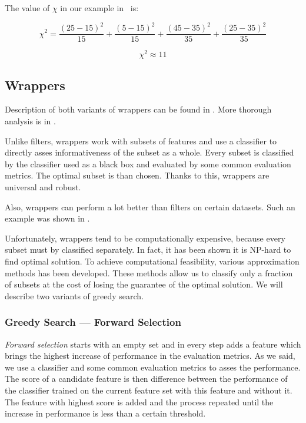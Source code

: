 The value of $\chi$ in our example in 
~is:

\begin{equation}
\chi^2 = 
\frac{\left(25-15\right)^2}{15} +
\frac{\left(5-15\right)^2}{15} +
\frac{\left(45-35\right)^2}{35} +
\frac{\left(25-35\right)^2}{35}
\end{equation}

\begin{equation}
\chi^2 \approx 11
\end{equation}


\subsection{Wrappers}

Description of both variants of wrappers can be found in \citet{GuyEli03}.
More thorough analysis is in \citet{kohavi1997wrappers}.

Unlike filters, wrappers work with subsets of features
and use a classifier to directly asses informativeness of the subset as a whole.
Every subset is classified by the classifier used as a black box
and evaluated by some common evaluation metrics.
The optimal subset is than chosen.
Thanks to this, wrappers are universal and robust.

Also, wrappers can perform a lot better than filters on certain datasets.
Such an example was shown in .

Unfortunately, wrappers tend to be computationally expensive,
because every subset must by classified separately.
In fact, it has been shown it is NP-hard to find optimal solution.
To achieve computational feasibility, various approximation methods has been developed.
These methods allow us to classify only a fraction of subsets
at the cost of losing the guarantee of the optimal solution.
We will describe two variants of greedy search.


\subsubsection{Greedy Search --- Forward Selection}

{\it Forward selection} starts with an empty set and in every step adds a feature which brings the highest increase of performance in the evaluation metrics.
As we said, we use a classifier and some common evaluation metrics to asses the performance.
The score of a candidate feature is then difference between the performance of the classifier trained on the current feature set with this feature and without it.
The feature with highest score is added and the process repeated until the increase in performance is less than a certain threshold. 

